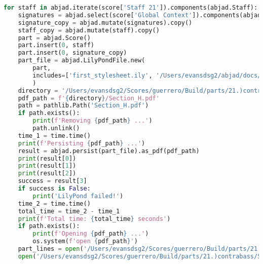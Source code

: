 \begin{lstlisting}[language=Python, caption=Invocation Source Code]
for staff in abjad.iterate(score['Staff 21']).components(abjad.Staff):
    signatures = abjad.select(score['Global Context']).components(abjad.Staff)
    signature_copy = abjad.mutate(signatures).copy()
    staff_copy = abjad.mutate(staff).copy()
    part = abjad.Score()
    part.insert(0, staff)
    part.insert(0, signature_copy)
    part_file = abjad.LilyPondFile.new(
        part,
        includes=['first_stylesheet.ily', '/Users/evansdsg2/abjad/docs/source/_stylesheets/abjad.ily'],
        )
    directory = '/Users/evansdsg2/Scores/guerrero/Build/parts/21.)contrabass'
    pdf_path = f'{directory}/Section_H.pdf'
    path = pathlib.Path('Section_H.pdf')
    if path.exists():
        print(f'Removing {pdf_path} ...')
        path.unlink()
    time_1 = time.time()
    print(f'Persisting {pdf_path} ...')
    result = abjad.persist(part_file).as_pdf(pdf_path)
    print(result[0])
    print(result[1])
    print(result[2])
    success = result[3]
    if success is False:
        print('LilyPond failed!')
    time_2 = time.time()
    total_time = time_2 - time_1
    print(f'Total time: {total_time} seconds')
    if path.exists():
        print(f'Opening {pdf_path} ...')
        os.system(f'open {pdf_path}')
    part_lines = open('/Users/evansdsg2/Scores/guerrero/Build/parts/21.)contrabass/Section_H.ly').readlines()
    open('/Users/evansdsg2/Scores/guerrero/Build/parts/21.)contrabass/Section_H.ly', 'w').writelines(part_lines[15:-1])
\end{lstlisting}
